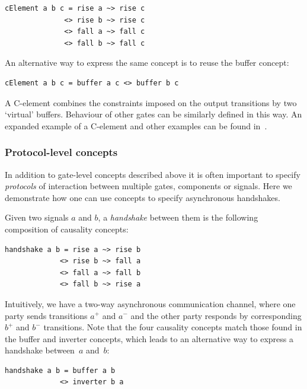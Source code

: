 \documentclass[british,conference,compsoc]{IEEEtran}
\begin{document}
\begin{verbatim}
cElement a b c = rise a ~> rise c 
              <> rise b ~> rise c
              <> fall a ~> fall c 
              <> fall b ~> fall c
\end{verbatim}

An alternative way to express the same concept is to reuse the buffer concept:

\begin{verbatim}
cElement a b c = buffer a c <> buffer b c
\end{verbatim}

A C-element combines the constraints imposed on the output
transitions by two `virtual' buffers. Behaviour of other gates can be similarly
defined in this way. An expanded example of a C-element and other examples can 
be found in~\cite{2015_Beaumont_MEMOCODE}.

\vspace{-2mm}

\subsubsection{Protocol-level concepts} In addition to gate-level concepts
described above it is often important to specify \emph{protocols}
of interaction between multiple gates, components or signals. Here we 
demonstrate how one can use concepts to specify asynchronous handshakes.

Given two signals $a$ and $b$, a \emph{handshake} between them is
the following composition of causality concepts:

\begin{verbatim}
handshake a b = rise a ~> rise b 
             <> rise b ~> fall a 
             <> fall a ~> fall b 
             <> fall b ~> rise a
\end{verbatim}

Intuitively, we have a two-way asynchronous communication channel,
where one party sends transitions $a^{+}$ and $a^{-}$ and the other
party responds by corresponding $b^{+}$ and $b^{-}$ transitions.
Note that the four causality concepts match those found
in the buffer and inverter concepts, which leads to an alternative
way to express a handshake between~$a$ and~$b$:

\begin{verbatim}
handshake a b = buffer a b 
             <> inverter b a
\end{verbatim}
\end{document}
